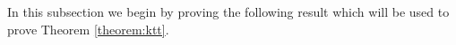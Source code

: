 \documentclass[12pt]{article}%
\begin{document}
%   
%   

In this subsection we begin by proving the following result
which will be used to prove 
Theorem \ref{theorem:ktt}.  
\end{document}
